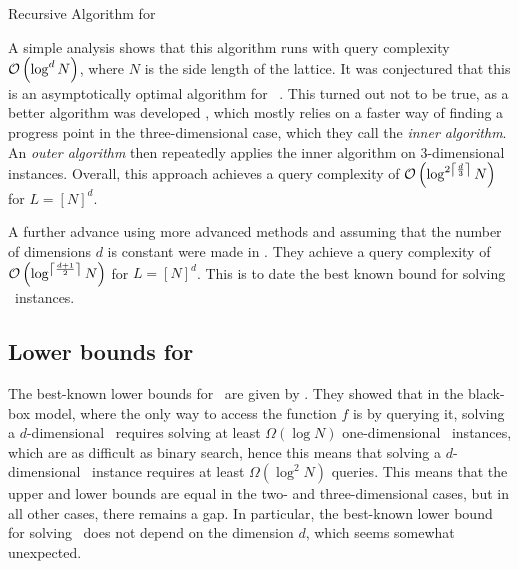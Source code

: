 \begin{algorithm}
	\caption{Recursive Algorithm for \Tarski}
	\label{alg:recursive_tarski_solver}
	\Fn{\RecursiveTarskiSolver{$f : L \rightarrow L$, $d$}}{
		\tcc{Binary search in the $d$-th dimension}
		\Let{l}{0}, \Let{r}{$N_d$} \tcc*[r]{The search space is $[l, r[$}
		\While{$r - l > 1$}{
			\Let{$m$}{$\floor{\frac{l + r}{2}}$} \tcc*[r]{Middle of the interval}
			\If{$d = 1$}{
				\Let{$x^*$}{$m$}
			}
			\Else{
				\tcc{Solve the $d-1$ dimensional instance}
				\Let{$x^*$}{\RecursiveTarskiSolver{$f_{d=m}, d-1$}} \;
			}
			\If{$f(x^*)[d] \leq x^*[d]$}{
				\Let{r}{$m$}
			}
			\Else{
				\Let{l}{$m$}
			}
		}
		\Return{$x^*$}
	}
\end{algorithm}

A simple analysis shows that this algorithm runs with query complexity $\mathcal{O}\left(\log^{d}{N}\right)$, where $N$ is the side length of the lattice. It was conjectured that this is an asymptotically optimal algorithm for \Tarski\ . This turned out not to be true, as a better algorithm was developed , which mostly relies on a faster way of finding a progress point in the three-dimensional case, which they call the \emph{inner algorithm}. An \emph{outer algorithm} then repeatedly applies the inner algorithm on 3-dimensional instances. Overall, this approach achieves a query complexity of $\mathcal{O}\left(\log^{2\left\lceil\frac{d}{3}\right\rceil}{N}\right)$ for $L = [N]^d$.

A further advance using more advanced methods and assuming that the number of dimensions $d$ is constant were made in . They achieve a query complexity of $\mathcal{O}\left(\log^{\left\lceil\frac{d+1}{2}\right\rceil}{N}\right)$ for $L = [N]^d$. This is to date the best known bound for solving \Tarski\ instances.

\subsection{Lower bounds for \Tarski}

The best-known lower bounds for \Tarski\ are given by . They showed that in the black-box model, where the only way to access the function $f$ is by querying it, solving a $d$-dimensional \Tarski\ requires solving at least $\Omega(\log{N})$ one-dimensional \Tarski\ instances, which are as difficult as binary search, hence this means that solving a $d$-dimensional \Tarski\ instance requires at least $\Omega(\log^{2}{N})$ queries. This means that the upper and lower bounds are equal in the two- and three-dimensional cases, but in all other cases, there remains a gap. In particular, the best-known lower bound for solving \Tarski\ does not depend on the dimension $d$, which seems somewhat unexpected.

